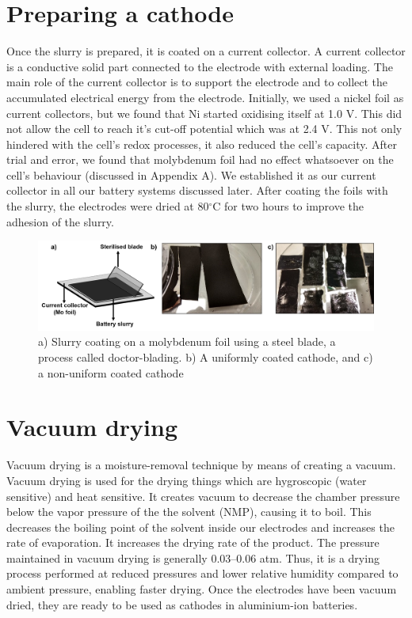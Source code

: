 \section{Preparing a cathode}
Once the slurry is prepared, it is coated on a current collector. A current collector is a conductive solid part connected to the electrode with external loading. The main role of the current collector is to support the electrode and to collect the accumulated electrical energy from the electrode\cite{}. Initially, we used a  nickel foil as current collectors, but we found that Ni started oxidising itself at 1.0 V. This did not allow the cell to reach it's cut-off potential which was at 2.4 V. This not only hindered with the cell's redox processes, it also reduced the cell's capacity. After trial and error, we found that molybdenum foil had no effect whatsoever on the cell's behaviour (discussed in Appendix A). We established it as our current collector in all our battery systems discussed later. After coating the foils with the slurry, the electrodes were dried at 80$^{\circ}$C for two hours to improve the adhesion of the slurry. 
\begin{figure}[h!]
\centering
\includegraphics[width=\textwidth]{Figures/coating}
\caption{a) Slurry coating on a molybdenum foil using a steel blade, a process called doctor-blading. b) A uniformly coated cathode, and c) a non-uniform coated cathode}
\end{figure}
\section{Vacuum drying}
Vacuum drying is a moisture-removal technique by means of creating a vacuum. Vacuum drying is used for the drying things which are hygroscopic (water sensitive) and heat sensitive. It creates vacuum to decrease the chamber pressure below the vapor pressure of the the solvent (NMP), causing it to boil. This decreases the boiling point of the solvent inside our electrodes and increases the rate of evaporation. It increases the drying rate of the product. The pressure maintained in vacuum drying is generally 0.03–0.06 atm. Thus, it is a drying process performed at reduced pressures and lower relative humidity compared to ambient pressure, enabling faster drying. Once the electrodes have been vacuum dried, they are ready to be used as cathodes in aluminium-ion batteries. 
